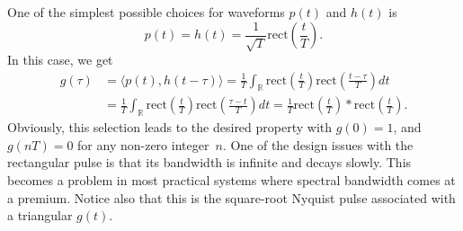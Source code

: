 \begin{example}
One of the simplest possible choices for waveforms $p(t)$ and $h (t)$ is
\begin{equation*}
p(t) = h (t) = \frac{1}{\sqrt{T}} \mathrm{rect} \left( \frac{t}{T} \right) .
\end{equation*}
In this case, we get
\begin{equation*}
\begin{split}
g(\tau) &= \langle p(t), h (t-\tau) \rangle
= \frac{1}{T} \int_{\mathbb{R}} \mathrm{rect} \left( \frac{t}{T} \right)
\mathrm{rect} \left( \frac{t - \tau}{T} \right) dt \\
&= \frac{1}{T} \int_{\mathbb{R}} \mathrm{rect} \left( \frac{t}{T} \right)
\mathrm{rect} \left( \frac{\tau - t}{T} \right) dt
= \frac{1}{T} \mathrm{rect} \left( \frac{t}{T} \right)
\ast \mathrm{rect}\left( \frac{t}{T} \right) .
\end{split}
\end{equation*}
Obviously, this selection leads to the desired property with $g(0) = 1$, and $g(nT) = 0$ for any non-zero integer~$n$.
One of the design issues with the rectangular pulse is that its bandwidth is infinite and decays slowly.
This becomes a problem in most practical systems where spectral bandwidth comes at a premium.
Notice also that this is the square-root Nyquist pulse associated with a triangular $g(t)$.
\end{example}

